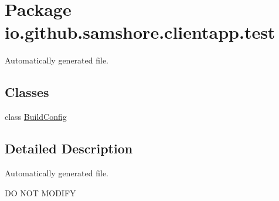 \hypertarget{namespaceio_1_1github_1_1samshore_1_1clientapp_1_1test}{}\section{Package io.\+github.\+samshore.\+clientapp.\+test}
\label{namespaceio_1_1github_1_1samshore_1_1clientapp_1_1test}


Automatically generated file.  


\subsection*{Classes}
\begin{DoxyCompactItemize}
\item 
class \hyperlink{classio_1_1github_1_1samshore_1_1clientapp_1_1test_1_1_build_config}{Build\+Config}
\end{DoxyCompactItemize}


\subsection{Detailed Description}
Automatically generated file. 

DO N\+OT M\+O\+D\+I\+FY 